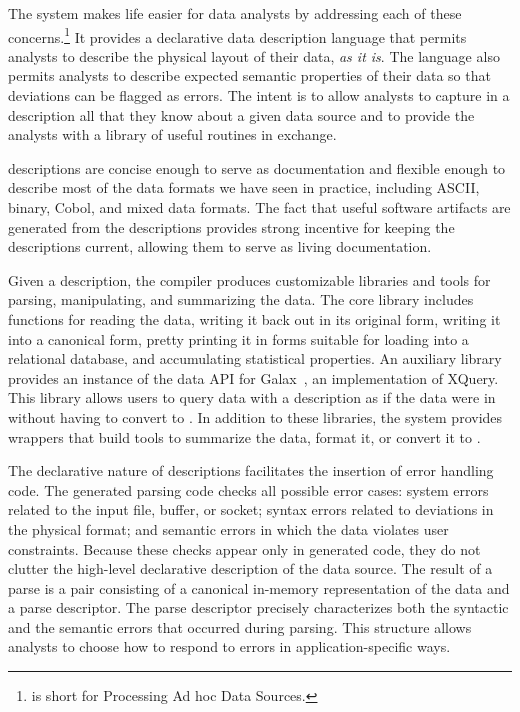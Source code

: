 \documentclass[times]{acm-sigplan}
\begin{document}
The \pads{} system makes life easier for data analysts by addressing
each of these concerns.\footnote{
  \pads{} is short for Processing Ad hoc Data Sources.
}
It provides a declarative data description
language that permits analysts to describe the physical layout of
their data, \textit{as it is}.  The language also permits analysts to
describe expected semantic properties of their data so that deviations can
be flagged as errors. The intent is to allow analysts to capture in a
\pads{} description all that they know about a given data source
and to provide the analysts with a library of useful routines in exchange. 


\pads{} descriptions are concise enough to
serve as documentation and flexible enough to describe most of
the data formats we have seen in practice, including ASCII, binary,
Cobol, and mixed data formats.  The fact that useful software
artifacts are generated from the descriptions provides strong
incentive for keeping the descriptions current, allowing them to serve
as living documentation.  

Given a \pads{} description, the \pads{} compiler produces customizable \C{} libraries
and tools for parsing, manipulating, and summarizing the data. 
The core \C{} library includes functions for reading the data, writing it 
back out in its original form, writing it into a canonical \xml{} form, pretty printing
it in forms suitable for loading into a relational database, and accumulating  
statistical properties.  An auxiliary library provides 
an instance of the data API for Galax~\cite{galax,galaxmanual}, an implementation of XQuery.  This 
library allows users to query data with a \pads{} description as if the data were
in \xml{} without having to convert to \xml{}.  In addition to these libraries,
the \pads{} system provides wrappers that build tools to 
summarize the data, format it,  or convert it to \xml{}.

The declarative nature of \pads{} descriptions facilitates the
insertion of error handling code.
The generated parsing code checks all possible error cases: system
errors related to the input file, buffer, or socket; syntax errors
related to deviations in the physical format; and semantic errors in
which the data violates user constraints.  Because these checks appear
only in generated code, they do not clutter the high-level declarative
description of the data source.
The result of a parse is a pair consisting of a canonical in-memory
representation of the data and a parse descriptor. The parse
descriptor precisely characterizes both the syntactic and the semantic
errors that occurred during parsing.  This structure allows analysts
to choose how to respond to errors in application-specific ways.  
\end{document}
